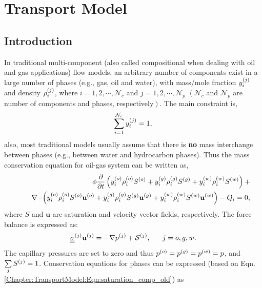 
\chapter{Transport Model}\label{Chapter:TransportModel}

\section{Introduction}\label{Chapter:TransportModel:Section:Introduction}
In traditional multi-component (also called compositional when dealing with oil and gas applications) flow models, an arbitrary number of components exist in a large number of phases (e.g., gas, oil and water), with mass/mole fraction $\mfr[y]{i}{j}$ and density $\mfr[\rho]{i}{j}$, where $i = 1, 2, \cdots, \mathcal{N}_{c}$ and $j=1, 2, \cdots, \mathcal{N}_{p}$ $\left(\mathcal{N}_{c}\right.$ and $\mathcal{N}_{p}$ are number of components and phases, respectively$\left.\right)$. The main constraint is,
   \begin{displaymath}
      \summation_{i=1}^{\mathcal{N}_{c}} \mfr[y]{i}{j} = 1,
   \end{displaymath}
also, most traditional models usually assume that there is {\bf no} mass interchange between phases (e.g., between water and hydrocarbon phases). Thus the mass conservation equation for oil-gas system can be written as,
   \begin{eqnarray}
      &&\phi \frc{\partial}{\partial t}\left( \mfr[y]{i}{o} \mfr[\rho]{i}{o} \mfr[S]{}{o} + \mfr[y]{i}{g} \mfr[\rho]{i}{g} \mfr[S]{}{g} +  \mfr[y]{i}{w} \mfr[\rho]{i}{w} \mfr[S]{}{w}\right) + \nonumber \\
        &&\;\;\;\; \nabla \cdot \left(\mfr[y]{i}{o} \mfr[\rho]{i}{o}\mfr[S]{}{o}  \mfr[\mathbf{u}]{}{o} + \mfr[y]{i}{g}\mfr[\rho]{i}{g}\mfr[S]{}{g} \mfr[\mathbf{u}]{}{g} + \mfr[y]{i}{w} \mfr[\rho]{i}{w}\mfr[S]{}{w} \mfr[\mathbf{u}]{}{w} \right) - Q_i = 0, \label{Chapter:TransportModel:Eqn:saturation_comp_old}
   \end{eqnarray}
where $S$ and $\mathbf{u}$ are saturation and velocity vector fields, respectively. The force balance is expressed as:
   \begin{equation}
       \mfr[\underline{\underline{\sigma}}]{}{j} \mfr[\mathbf u]{}{j} = - \nabla \mfr[p]{}{j} + \mfr[\mathcal{S}]{}{j}, ~~~~~ j = o,g,w .\label{Chapter:TransportModel:Eqn:ForceBalance}
   \end{equation}
The capillary pressures are set to zero and thus $\mfr[p]{}{o} = \mfr[p]{}{g} = \mfr[p]{}{w}  = p $, and $\summation_{j}\mfr[S]{}{j} = 1$. Conservation equations for phases can be expressed (based on Eqn. \ref{Chapter:TransportModel:Eqn:saturation_comp_old}) as 

